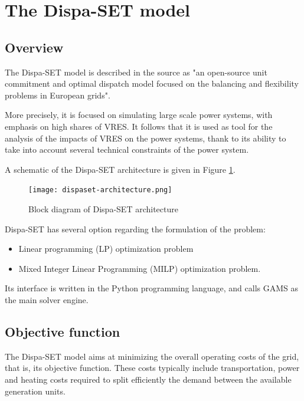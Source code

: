 \section{The Dispa-SET model}

\subsection{Overview}

The Dispa-SET model \cite{dispaset} is described in the source \cite{dispaset2} as "an open-source unit commitment and optimal dispatch model focused on the balancing and flexibility problems in European grids".

More precisely, it is focused on simulating large scale power systems, with emphasis on high shares of VRES. It follows that it is used as tool for the analysis of the impacts of VRES on the power systems, thank to its ability to take into account several technical constraints of the power system.

A schematic of the Dispa-SET architecture is given in Figure \ref{dispaset-architecture}.

\begin{figure}[h]
    \texttt{[image: dispaset-architecture.png]}
    \caption{Block diagram of Dispa-SET architecture}
    \label{dispaset-architecture}
\end{figure}

Dispa-SET has several option regarding the formulation of the problem:
\begin{itemize}
    \item Linear programming (LP) optimization problem
    \item Mixed Integer Linear Programming (MILP) optimization problem.
\end{itemize}

Its interface is written in the Python programming language, and calls GAMS \cite{GAMS} as the main solver engine.

\subsection{Objective function}

The Dispa-SET model aims at minimizing the overall operating costs of the grid, that is, its objective function. These costs typically include transportation, power and heating costs required to split efficiently the demand between the available generation units.

